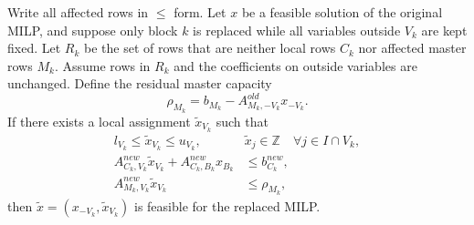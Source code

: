 \documentclass[10pt,a4paper]{amsart}
\begin{document}
\begin{proposition}
\label{prop:feasible_replacement}
Write all affected rows in $\le$ form. Let $x$ be a feasible solution of the original MILP, and suppose only block $k$ is replaced while all variables outside $V_k$ are kept fixed. Let $R_k$ be the set of rows that are neither local rows $C_k$ nor affected master rows $M_k$. Assume rows in $R_k$ and the coefficients on outside variables are unchanged. Define the residual master capacity
\begin{equation}
\rho_{M_k}
=
b_{M_k}-A^{old}_{M_k,-V_k}x_{-V_k}.
\end{equation}
If there exists a local assignment $\tilde{x}_{V_k}$ such that
\begin{align}
l_{V_k}\le \tilde{x}_{V_k}\le u_{V_k},\qquad
&\tilde{x}_j\in\mathbb{Z}\quad \forall j\in I\cap V_k, \label{eq:domain_condition}\\
A^{new}_{C_k,V_k}\tilde{x}_{V_k}
+A^{new}_{C_k,B_k}x_{B_k}
&\le b^{new}_{C_k}, \label{eq:local_condition}\\
A^{new}_{M_k,V_k}\tilde{x}_{V_k}
&\le \rho_{M_k}, \label{eq:master_condition}
\end{align}
then $\tilde{x}=(x_{-V_k},\tilde{x}_{V_k})$ is feasible for the replaced MILP.
\end{proposition}
\end{document}
